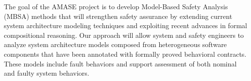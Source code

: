 The goal of the AMASE project is to develop Model-Based Safety Analysis (MBSA) methods that will strengthen safety assurance by extending current system architecture modeling techniques and exploiting recent advances in formal compositional reasoning. Our approach will allow system and safety engineers to analyze system architecture models composed from heterogeneous software components that have been annotated with formally proved behavioral contracts. These models include fault behaviors and support assessment of both nominal and faulty system behaviors.

